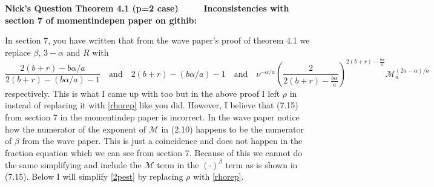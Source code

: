 \documentclass[a4paper,11pt]{article}
\numberwithin{equation}{section}
\theoremstyle{plain}
\theoremstyle{definition}
\newcounter{NQ}
\newenvironment{NickQuestion}[1][] %
{\refstepcounter{NQ}
	\begin{mdframed}[backgroundcolor=lightgray]\textbf{Nick's Question \theNQ \: #1~~}~~~\noindent}%
	{\end{mdframed}}
\numberwithin{NQ}{section}
\numberwithin{LQ}{section}
\numberwithin{ZQ}{section}
\begin{document}
\begin{NickQuestion}[Theorem 4.1 (p=2 case)]
		\noindent \textbf{Inconsistencies with section 7 of momentindepen paper on githib:}

		In section 7, you have written that from the wave paper's proof of theorem 4.1 we replace $\beta$, $3-\alpha$ and $R$ with
		\[
		\frac{2(b+r)-b\alpha/a}{2(b+r)-(b\alpha/a)-1} \quad \text{and} \quad 2(b+r)-(b\alpha/a)-1 \quad \text{and} \quad \nu^{-\alpha/a} \left(\frac{2}{2(b+r)-\frac{b\alpha}{a}}\right)^{2(b+r)-\frac{b\alpha}{a}}  \mathcal{M}_a^{(2a-\alpha)/a}
		\]
		respectively. This is what I came up with too but in the above proof I left $\rho$ in instead of replacing it with \ref{rhorep} like you did. However, I believe that (7.15) from section 7 in the momentindep paper is incorrect. In the wave paper notice how the numerator of the exponent of $\mathcal{M}$ in (2.10) happens to be the numerator of $\beta$ from the wave paper. This is just a coincidence and does not happen in the fraction equation which we can see from section 7. Because of this we cannot do the same simplifying and include the $\mathcal{M}$ term in the $(\cdot)^{\beta}$ term as is shown in (7.15). Below I will simplify \ref{2pest} by replacing $\rho$ with \ref{rhorep}.


\end{NickQuestion}
\end{document}
